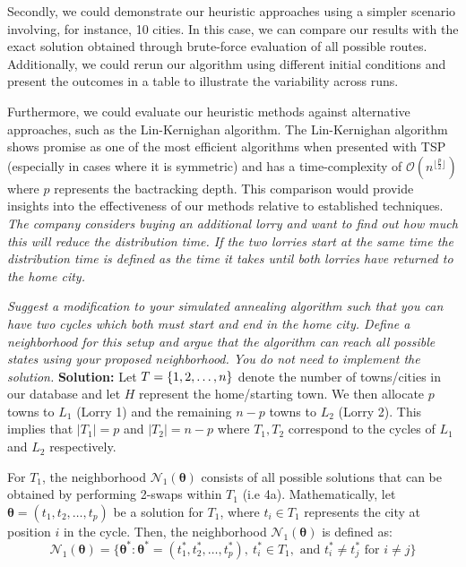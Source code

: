 Secondly, we could demonstrate our heuristic approaches using a simpler scenario involving, for instance, 10 cities. In this case, we can compare our results with the exact solution obtained through brute-force evaluation of all possible routes. Additionally, we could rerun our algorithm using different initial conditions and present the outcomes in a table to illustrate the variability across runs.

Furthermore, we could evaluate our heuristic methods against alternative approaches, such as the Lin-Kernighan algorithm. The Lin-Kernighan algorithm shows promise as one of the most efficient algorithms when presented with TSP (especially in cases where it is symmetric) and has a time-complexity of $\mathcal{O}(n^{\lfloor \frac{p}{2} \rfloor})$ where $p$ represents the bactracking depth. This comparison would provide insights into the effectiveness of our methods relative to established techniques.
\emph{The company considers buying an additional lorry and want to find out how much this will
reduce the distribution time. If the two lorries start at the same time the distribution time is
defined as the time it takes until both lorries have returned to the home city.} 

\emph{Suggest a modification to your simulated annealing algorithm such that you can have
two cycles which both must start and end in the home city. Define a neighborhood for
this setup and argue that the algorithm can reach all possible states using your proposed
neighborhood. You do not need to implement the solution.} \spaze
\textbf{Solution:} \spaze
Let $T = \left\{ 1, 2, \ldots, n \right\}$ denote the number of towns/cities in our database and let $H$ represent the home/starting town. \spaze 
We then allocate $p$ towns to $L_1$ (Lorry 1) and the remaining $n-p$ towns to $L_2$ (Lorry 2). This implies that $|T_1| = p$ and $|T_2|= n-p$ where $T_1, T_2$ correspond to the cycles of $L_1$ and $L_2$ respectively.  

For $T_1$, the neighborhood \( \mathcal{N}_1(\boldsymbol{\theta}) \) consists of all possible solutions that can be obtained by performing 2-swaps within $T_1$ (i.e 4a). Mathematically, let \( \boldsymbol{\theta} = (t_1, t_2, \ldots, t_p) \) be a solution for $T_1$, where \( t_i \in T_1 \) represents the city at position \( i \) in the cycle. Then, the neighborhood \( \mathcal{N}_1(\boldsymbol{\theta}) \) is defined as:
\[ \mathcal{N}_1(\boldsymbol{\theta}) = \{ \boldsymbol{\theta}^{*} : \boldsymbol{\theta}^{*} = (t_{1}^{*}, t_{2}^{*}, \ldots, t_{p}^{*}), \ t_{i}^{*} \in T_1, \text{ and } t_{i}^{*} \neq t_{j}^{*} \text{ for } i \neq j \} \]

